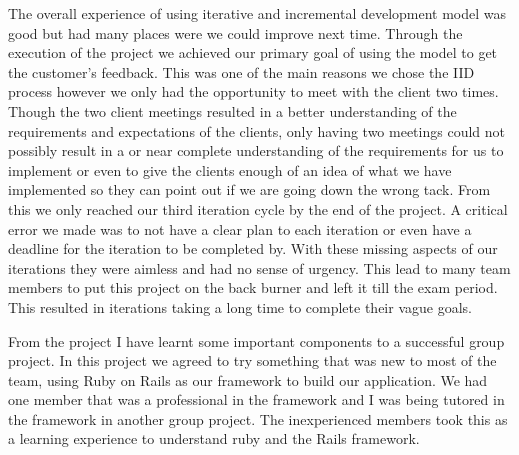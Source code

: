 \documentclass{style/CRPITStyle}
\begin{document}
The overall experience of using iterative and incremental development model was
good but had many places were we could improve next time. Through the
execution of the project we achieved our primary goal of using the model to get
the customer's feedback. This was one of the main reasons we chose the IID
process however we only had the opportunity to meet with the client two times.
Though the two client meetings resulted in a better understanding of the
requirements and expectations of the clients, only having two meetings
could not possibly result in a or near complete understanding of the
requirements for us to implement or even to give the clients enough of an idea of
what we have implemented so they can point out if we are going down the wrong
tack.
From this we only reached our third iteration cycle by the end of the project.
A critical error we made was to not have a clear plan to each iteration or even
have a deadline for the iteration to be completed by. With these missing aspects
of our iterations they were aimless and had no sense of urgency. This lead to
many team members to put this project on the back burner and left it till the
exam period. This resulted in iterations taking a long time to complete their
vague goals.

\vspace{.1in}

From the project I have learnt some important components to a successful group
project. In this project we agreed to try something that was new to most of the
team, using Ruby on Rails as our framework to build our application. We had one
member that was a professional in the framework and I was being tutored in the
framework in another group project. The inexperienced members took this as a
learning experience to understand ruby and the Rails framework.

\vspace{.1in}
\end{document}
